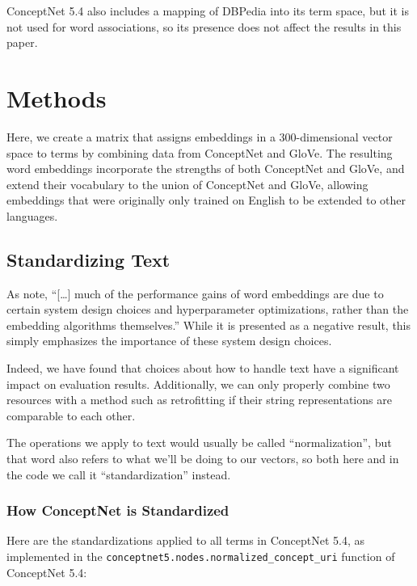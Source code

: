 \documentclass[letterpaper]{article}
\begin{document}
ConceptNet 5.4 also includes a mapping of DBPedia \cite{auer2007dbpedia} into
its term space, but it is not used for word associations, so its presence does
not affect the results in this paper.



\section{Methods}

Here, we create a matrix that assigns embeddings in a 300-dimensional vector
space to terms by combining data from ConceptNet and GloVe. The resulting word
embeddings incorporate the strengths of both ConceptNet and GloVe, and extend
their vocabulary to the union of ConceptNet and GloVe, allowing embeddings that
were originally only trained on English to be extended to other languages.

\subsection{Standardizing Text}

As  note,
``[\ldots] much of the performance gains of word embeddings are due to certain
system design choices and hyperparameter optimizations, rather than the
embedding algorithms themselves.'' While it is presented as a negative result,
this simply emphasizes the importance of these system design choices.

Indeed, we have found that choices about how to handle text have a significant
impact on evaluation results. Additionally, we can only properly combine two
resources with a method such as retrofitting if their string representations
are comparable to each other.

The operations we apply to text would usually be called ``normalization'',
but that word also refers to what we'll be doing to our vectors, so both
here and in the code we call it ``standardization'' instead.

\subsubsection{How ConceptNet is Standardized}

Here are the standardizations applied to all terms in ConceptNet 5.4, as
implemented in the {\tt conceptnet5.nodes.normalized\_concept\_uri} function
of ConceptNet 5.4:
\end{document}
